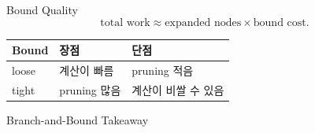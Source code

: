 \begin{frame}{Bound Quality}
\[
\text{total work}\approx
\text{expanded nodes}\times\text{bound cost}.
\]
\small\begin{tabular}{lll}\toprule
Bound&장점&단점\\\midrule
loose&계산이 빠름&pruning 적음\\
tight&pruning 많음&계산이 비쌀 수 있음\\\bottomrule
\end{tabular}
\end{frame}
\begin{frame}{Branch-and-Bound Takeaway}
\end{frame}
